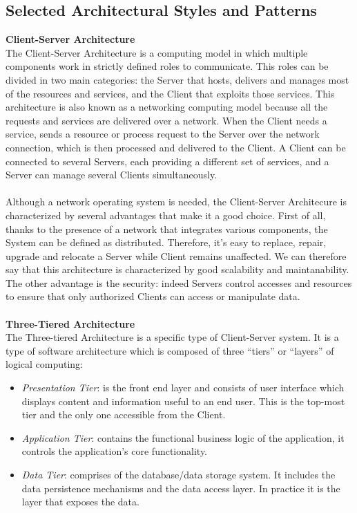\documentclass[a4paper, 12pt, oneside, table]{article}
\begin{document}
\subsection{Selected Architectural Styles and Patterns}
\textbf{Client-Server Architecture}\\
The Client-Server Architecture is a computing model in which multiple components work in strictly defined roles to communicate. This roles can be divided in two main categories: the Server that hosts, delivers and manages most of the resources and services, and the Client that exploits those services. This architecture is also known as a networking computing model because all the requests and services are delivered over a network. When the Client needs a service, sends a resource or process request to the Server over the network connection, which is then processed and delivered to the Client. A Client can be connected to several Servers, each providing a different set of services, and a Server can manage several Clients simultaneously.\\
\\
Although a network operating system is needed, the Client-Server Architecure is characterized by several advantages that make it a good choice. First of all, thanks to the presence of a network that integrates various components, the System can be defined as distributed. Therefore, it's easy to replace, repair, upgrade and relocate a Server while Client remains unaffected. We can therefore say that this architecture is characterized by good scalability and maintanability. The other advantage is the security: indeed Servers control accesses and resources to ensure that only authorized Clients can access or manipulate data.\\
\\
\textbf{Three-Tiered Architecture}\\
The Three-tiered Architecture is a specific type of Client-Server system. It is a type of software architecture which is composed of three “tiers” or “layers” of logical computing:
\begin{itemize}
\item \textit{Presentation Tier}: is the front end layer and consists of user interface which displays content and information useful to an end user. This is the top-most tier and the only one accessible from the Client.
\item \textit{Application Tier}: contains the functional business logic of the application, it controls the application’s core functionality.
\item \textit{Data Tier}: comprises of the database/data storage system. It includes the data persistence mechanisms and the data access layer. In practice it is the layer that exposes the data. 
\end{itemize}
\end{document}
